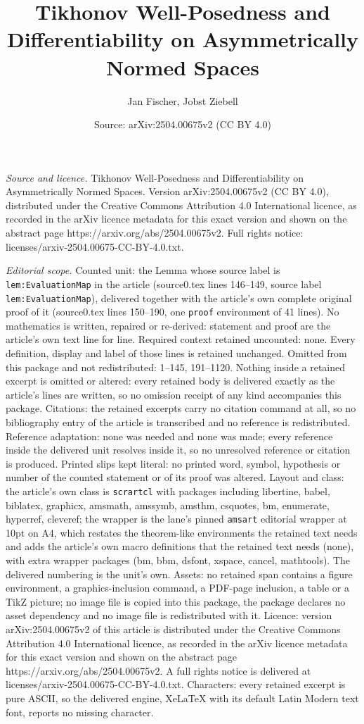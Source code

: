 \documentclass[10pt,a4paper]{amsart}
\title[Tikhonov Well-Posedness and Differentiability on Asymmetrica]{Tikhonov Well-Posedness and Differentiability on Asymmetrically Normed Spaces}
\author{Jan Fischer, Jobst Ziebell}
\date{Source: arXiv:2504.00675v2 (CC BY 4.0)}
\begin{document}
\maketitle

\noindent\emph{Source and licence.} Tikhonov Well-Posedness and Differentiability on Asymmetrically Normed Spaces. Version arXiv:2504.00675v2 (CC BY 4.0), distributed under the Creative Commons Attribution 4.0 International licence, as recorded in the arXiv licence metadata for this exact version and shown on the abstract page https://arxiv.org/abs/2504.00675v2. Full rights notice: licenses/arxiv-2504.00675-CC-BY-4.0.txt.\par\smallskip

\noindent\textit{Editorial scope.} Counted unit: the Lemma whose source label is \texttt{lem:EvaluationMap} in the article (source0.tex lines 146--149, source label \texttt{lem:EvaluationMap}), delivered together with the article's own complete original proof of it (source0.tex lines 150--190, one \texttt{proof} environment of 41 lines). No mathematics is written, repaired or re-derived: statement and proof are the article's own text line for line. Required context retained uncounted: none. Every definition, display and label of those lines is retained unchanged. Omitted from this package and not redistributed: 1--145, 191--1120. Nothing inside a retained excerpt is omitted or altered: every retained body is delivered exactly as the article's lines are written, so no omission receipt of any kind accompanies this package. Citations: the retained excerpts carry no citation command at all, so no bibliography entry of the article is transcribed and no reference is redistributed. Reference adaptation: none was needed and none was made; every reference inside the delivered unit resolves inside it, so no unresolved reference or citation is produced. Printed slips kept literal: no printed word, symbol, hypothesis or number of the counted statement or of its proof was altered. Layout and class: the article's own class is \texttt{scrartcl} with packages including libertine, babel, biblatex, graphicx, amsmath, amssymb, amsthm, csquotes, bm, enumerate, hyperref, cleveref; the wrapper is the lane's pinned \texttt{amsart} editorial wrapper at 10pt on A4, which restates the theorem-like environments the retained text needs and adds the article's own macro definitions that the retained text needs (none), with extra wrapper packages (bm, bbm, dsfont, xspace, cancel, mathtools). The delivered numbering is the unit's own. Assets: no retained span contains a figure environment, a graphics-inclusion command, a PDF-page inclusion, a table or a TikZ picture; no image file is copied into this package, the package declares no asset dependency and no image file is redistributed with it. Licence: version arXiv:2504.00675v2 of this article is distributed under the Creative Commons Attribution 4.0 International licence, as recorded in the arXiv licence metadata for this exact version and shown on the abstract page https://arxiv.org/abs/2504.00675v2. A full rights notice is delivered at licenses/arxiv-2504.00675-CC-BY-4.0.txt. Characters: every retained excerpt is pure ASCII, so the delivered engine, XeLaTeX with its default Latin Modern text font, reports no missing character.
\end{document}
